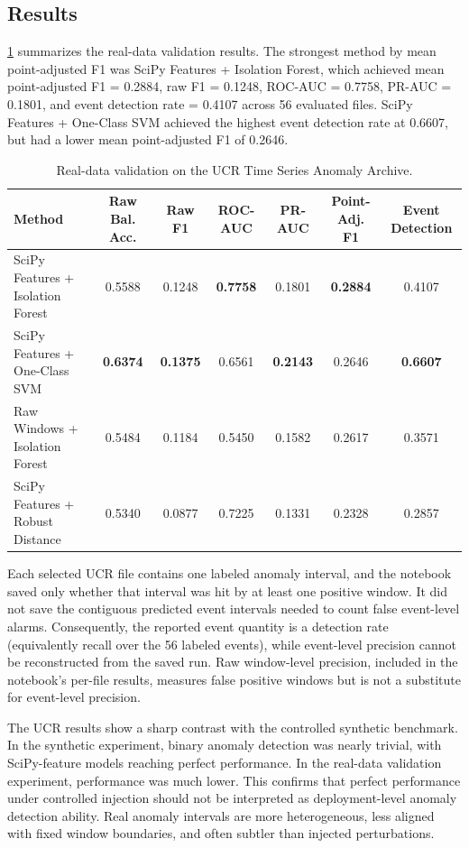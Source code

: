 \subsection{Results}

\cref{tab:ucr-results} summarizes the real-data validation results. The strongest method by mean point-adjusted F1 was SciPy Features + Isolation Forest, which achieved mean point-adjusted F1 = 0.2884, raw F1 = 0.1248, ROC-AUC = 0.7758, PR-AUC = 0.1801, and event detection rate = 0.4107 across 56 evaluated files. SciPy Features + One-Class SVM achieved the highest event detection rate at 0.6607, but had a lower mean point-adjusted F1 of 0.2646.

\begin{table}[htbp]
\centering
\caption{Real-data validation on the UCR Time Series Anomaly Archive.}
\label{tab:ucr-results}
\begin{tabular}{lcccccc}
\toprule
\textbf{Method} & \textbf{Raw Bal. Acc.} & \textbf{Raw F1} & \textbf{ROC-AUC} & \textbf{PR-AUC} & \textbf{Point-Adj. F1} & \textbf{Event Detection} \\
\midrule
SciPy Features + Isolation Forest & 0.5588 & 0.1248 & \textbf{0.7758} & 0.1801 & \textbf{0.2884} & 0.4107 \\
SciPy Features + One-Class SVM & \textbf{0.6374} & \textbf{0.1375} & 0.6561 & \textbf{0.2143} & 0.2646 & \textbf{0.6607} \\
Raw Windows + Isolation Forest & 0.5484 & 0.1184 & 0.5450 & 0.1582 & 0.2617 & 0.3571 \\
SciPy Features + Robust Distance & 0.5340 & 0.0877 & 0.7225 & 0.1331 & 0.2328 & 0.2857 \\
\bottomrule
\end{tabular}
\end{table}

Each selected UCR file contains one labeled anomaly interval, and the notebook saved only whether that interval was hit by at least one positive window. It did not save the contiguous predicted event intervals needed to count false event-level alarms. Consequently, the reported event quantity is a detection rate (equivalently recall over the 56 labeled events), while event-level precision cannot be reconstructed from the saved run. Raw window-level precision, included in the notebook's per-file results, measures false positive windows but is not a substitute for event-level precision.

The UCR results show a sharp contrast with the controlled synthetic benchmark. In the synthetic experiment, binary anomaly detection was nearly trivial, with SciPy-feature models reaching perfect performance. In the real-data validation experiment, performance was much lower. This confirms that perfect performance under controlled injection should not be interpreted as deployment-level anomaly detection ability. Real anomaly intervals are more heterogeneous, less aligned with fixed window boundaries, and often subtler than injected perturbations.

